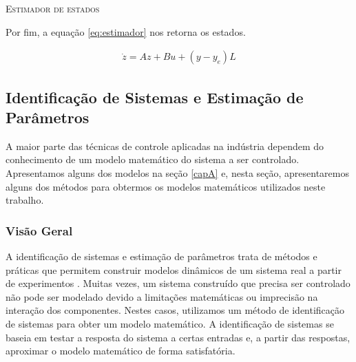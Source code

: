 \IncMargin{1em}
\begin{algorithm}[H]
	
	\label{alg:ee}
	\caption{\textsc{Estimador de estados}}
\end{algorithm}
\DecMargin{1em}


Por fim, a equação \ref{eq:estimador} nos retorna os estados.

\begin{equation}\label{eq:estimador}
\begin{matrix}
\dot{z}=Az+Bu+(y-y_e)L
\end{matrix}
\end{equation}

\subsection{Identificação de Sistemas e Estimação de Parâmetros}
A maior parte das técnicas de controle aplicadas na indústria dependem do conhecimento de um modelo matemático do sistema a ser controlado. Apresentamos alguns dos modelos na seção \ref{capA} e, nesta seção, apresentaremos alguns dos métodos para obtermos os modelos matemáticos utilizados neste trabalho.


\subsubsection{Visão Geral}
A identificação de sistemas e estimação de parâmetros trata de métodos e práticas que permitem construir modelos dinâmicos de um sistema real a partir de experimentos . Muitas vezes, um sistema construído que precisa ser controlado não pode ser modelado devido a limitações matemáticas ou imprecisão na interação dos componentes. Nestes casos, utilizamos um método de identificação de sistemas para obter um modelo matemático. A identificação de sistemas se baseia em testar a resposta do sistema a certas entradas e, a partir das respostas, aproximar o modelo matemático de forma satisfatória.

